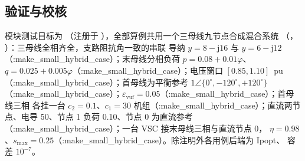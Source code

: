 \subsection{验证与校核}\label{subsec:tp-verify}

模块测试目标为 （注册于
），全部算例共用一个三母线九节点合成混合系统
（，
）：三母线全相齐全，支路阻抗角一致的串联
导纳 $y=8-\mathrm{j}16$ 与 $y=6-\mathrm{j}12$（:make\_small\_hybrid\_case）；末母线分相负荷
$p=0.08+0.01\varphi$、$q=0.025+0.005\varphi$（:make\_small\_hybrid\_case）；电压窗口
$[0.85,1.10]$~pu（:make\_small\_hybrid\_case）；首母线为平衡参考 $1\angle\{0^\circ,-120^\circ,
+120^\circ\}$（:make\_small\_hybrid\_case）；$\varepsilon_{\mathrm{vuf}}=0.05$（:make\_small\_hybrid\_case）；首母线三相
各挂一台 $c_2=0.1$、$c_1=30$ 机组（:make\_small\_hybrid\_case）；直流两节点、电导 50、节点 1 负荷
0.10、节点 0 为直流参考（:make\_small\_hybrid\_case）；一台 VSC 接末母线三相与直流节点 0，
$\eta=0.98$、$s_{\max}=0.25$（:make\_small\_hybrid\_case）。除注明外各用例后端为 Ipopt、
容差 $10^{-7}$。

